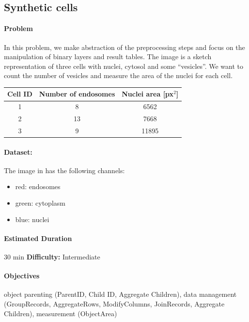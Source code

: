 \subsection{Synthetic cells}

\paragraph{Problem}
In this problem, we make abstraction of the preprocessing steps and focus on the manipulation of binary layers and result tables. The image is a sketch representation of three cells with nuclei, cytosol and some ``vesicles''. We want to count the number of vesicles and measure the area of the nuclei for each cell.

\begin{center}
\begin{tabular}{ccc}
    Cell ID& Number of endosomes& Nuclei area [px$^2$]\\\hline
    1&8&6562\\
    2&13&7668\\
    3&9&11895\\
\end{tabular}   
\end{center}

\paragraph{Dataset:} The image in  has the following channels:
\begin{itemize}\itemsep0em
    \item red: endosomes
    \item green: cytoplasm
    \item blue: nuclei
\end{itemize}

\paragraph{Estimated Duration} 30 min \quad \textbf{Difficulty:} Intermediate

\paragraph{Objectives} object parenting (ParentID, Child ID, Aggregate Children), data management (GroupRecords, AggregateRows, ModifyColumns, JoinRecords, Aggregate Children), measurement (ObjectArea)

